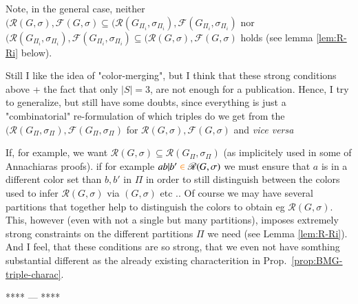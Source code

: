 \documentclass[final,3p,times]{elsarticle}
\newcommand{\ak}[1]{\begingroup\color{orange}#1\endgroup}
\begin{document}
{ Note, in the general case, neither $(\mathscr{R}(G,\sigma),\mathscr{F}(G,\sigma)
 \subseteq (\mathscr{R}(G_{\Pi_i},\sigma_{\Pi_i}),\mathscr{F}(G_{\Pi_i},\sigma_{\Pi_i})$
 nor $ (\mathscr{R}(G_{\Pi_i},\sigma_{\Pi_i}),\mathscr{F}(G_{\Pi_i},\sigma_{\Pi_i})
 \subseteq (\mathscr{R}(G,\sigma),\mathscr{F}(G,\sigma)$
 holds (see lemma \ref{lem:R-Ri} below).\smallskip 
 
 Still I like the idea of "color-merging", but I think that these 
 strong conditions above + the fact that only $|S|=3$, are
  not enough for a publication. Hence, I try to generalize, 
 but still have some doubts, since everything is just a 
 "combinatorial" re-formulation of which triples do we get 
 from the $(\mathscr{R}(G_{\Pi},\sigma_{\Pi}),\mathscr{F}(G_{\Pi},\sigma_{\Pi})$
 for $\mathscr{R}(G,\sigma),\mathscr{F}(G,\sigma)$ and \emph{vice versa}

  If, for example, we want 
  $\mathscr{R}(G,\sigma)\subseteq \mathscr{R}(G_{\Pi},\sigma_{\Pi})$
  (as implicitely used in some of Annachiaras proofs). 
  if for example $ab|b' \ak{\in}\mathscr{R}(G,\sigma)$ we must ensure that $a$ is in a different color set than $b,b'$
  in $\Pi$ in order to still distinguish between the colors 
  used to infer $\mathscr{R}(G,\sigma)$ via $(G,\sigma)$ etc .. 
  Of course we may have several partitions that together help
  to  distinguish the colors to obtain eg $\mathscr{R}(G,\sigma)$. 
  This, however (even with not a single but many partitions),  imposes
   extremely strong constraints on the different partitions $\Pi$
   we need (see Lemma \ref{lem:R-Ri}). 
  And I feel, that these conditions are so strong, that 
  we even not have somthing substantial different as
  the already existing characterition in Prop.\ \ref{prop:BMG-triple-charac}.
\begin{center}**** --- **** \end{center}
}







\end{document}
